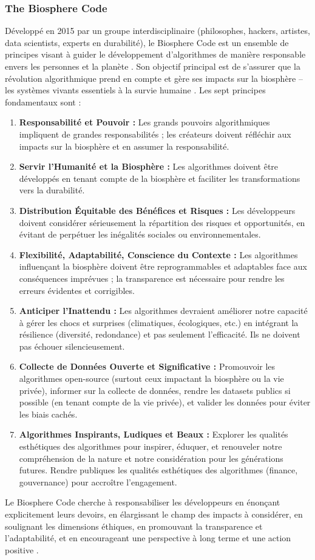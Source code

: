 \documentclass[10pt, twocolumn]{article}
\begin{document}
\subsubsection{The Biosphere Code}
Développé en 2015 par un groupe interdisciplinaire (philosophes, hackers, artistes, data scientists, experts en durabilité), le Biosphere Code est un ensemble de principes visant à guider le développement d'algorithmes de manière responsable envers les personnes et la planète \citep{Biosphere2015}. Son objectif principal est de s'assurer que la révolution algorithmique prend en compte et gère ses impacts sur la biosphère – les systèmes vivants essentiels à la survie humaine \citep{Biosphere2015}. Les sept principes fondamentaux sont \citep{Biosphere2015} :
\begin{enumerate}
    \item \textbf{Responsabilité et Pouvoir :} Les grands pouvoirs algorithmiques impliquent de grandes responsabilités ; les créateurs doivent réfléchir aux impacts sur la biosphère et en assumer la responsabilité.
    \item \textbf{Servir l'Humanité et la Biosphère :} Les algorithmes doivent être développés en tenant compte de la biosphère et faciliter les transformations vers la durabilité.
    \item \textbf{Distribution Équitable des Bénéfices et Risques :} Les développeurs doivent considérer sérieusement la répartition des risques et opportunités, en évitant de perpétuer les inégalités sociales ou environnementales.
    \item \textbf{Flexibilité, Adaptabilité, Conscience du Contexte :} Les algorithmes influençant la biosphère doivent être reprogrammables et adaptables face aux conséquences imprévues ; la transparence est nécessaire pour rendre les erreurs évidentes et corrigibles.
    \item \textbf{Anticiper l'Inattendu :} Les algorithmes devraient améliorer notre capacité à gérer les chocs et surprises (climatiques, écologiques, etc.) en intégrant la résilience (diversité, redondance) et pas seulement l'efficacité. Ils ne doivent pas échouer silencieusement.
    \item \textbf{Collecte de Données Ouverte et Significative :} Promouvoir les algorithmes open-source (surtout ceux impactant la biosphère ou la vie privée), informer sur la collecte de données, rendre les datasets publics si possible (en tenant compte de la vie privée), et valider les données pour éviter les biais cachés.
    \item \textbf{Algorithmes Inspirants, Ludiques et Beaux :} Explorer les qualités esthétiques des algorithmes pour inspirer, éduquer, et renouveler notre compréhension de la nature et notre considération pour les générations futures. Rendre publiques les qualités esthétiques des algorithmes (finance, gouvernance) pour accroître l'engagement.
\end{enumerate}
Le Biosphere Code cherche à responsabiliser les développeurs en énonçant explicitement leurs devoirs, en élargissant le champ des impacts à considérer, en soulignant les dimensions éthiques, en promouvant la transparence et l'adaptabilité, et en encourageant une perspective à long terme et une action positive \citep{Biosphere2015}.
\end{document}
